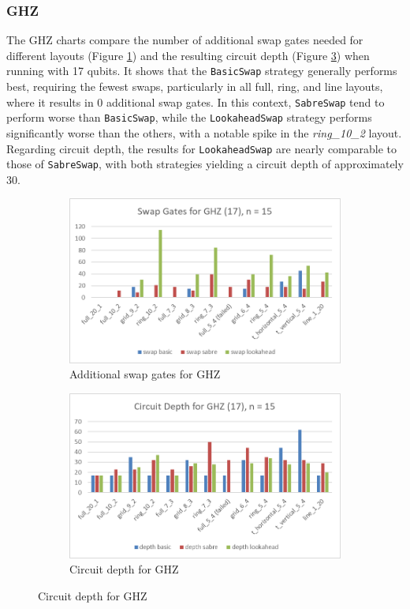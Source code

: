 \subsubsection{GHZ} %
The GHZ charts compare the number of additional swap gates needed for different layouts (Figure \ref{fig:chart-ghz}) and the resulting circuit depth (Figure \ref{fig:chart-ghz-depth}) when running with 17 qubits. It shows that the \lstinline{BasicSwap} strategy generally performs best, requiring the fewest swaps, particularly in all full, ring, and line layouts, where it results in 0 additional swap gates. In this context, \lstinline{SabreSwap} tend to perform worse than \lstinline{BasicSwap}, while the \lstinline{LookaheadSwap} strategy performs significantly worse than the others, with a notable spike in the \textit{ring\_10\_2} layout. Regarding circuit depth, the results for \lstinline{LookaheadSwap} are nearly comparable to those of \lstinline{SabreSwap}, with both strategies yielding a circuit depth of approximately 30.
\begin{figure}[htb]
    \centering
    \begin{subfigure}{0.48\linewidth}
        \includegraphics[width=\linewidth]{image/chart_ghz.png}
        \caption{Additional swap gates for GHZ}
        \label{fig:chart-ghz}
    \end{subfigure}
    \begin{subfigure}{0.48\linewidth}
        \includegraphics[width=\linewidth]{image/chart_ghz_depth.png}
        \caption{Circuit depth for GHZ}
        \label{fig:chart-ghz-depth}
    \end{subfigure}
\end{figure}

